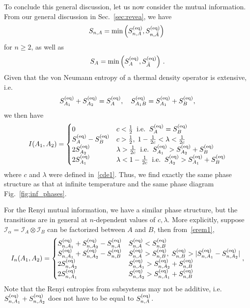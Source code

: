 \documentclass[a4paper,11pt]{article}
\newcommand\half{{\ensuremath{\frac{1}{2}}}}
\newcommand{\be}{\begin{equation}}
\newcommand{\ee}{\end{equation}}
\newcommand{\bca}{\begin{cases}}
\newcommand{\eca}{\end{cases}}
\newcommand\al{{\alpha}}
\newcommand\lam{\lambda}
\newcommand\ov{\over}
\newcommand\ha{{\half}}
\def\le{\left}
\def\ri{\right}
\newcommand\sE{{\ensuremath{{\mathcal E}}}}
\newcommand\sI{{\ensuremath{{\mathcal I}}}}
\begin{document}
To conclude this general discussion, let us now consider the mutual information. 
From our general discussion in Sec.~\ref{sec:revea}, we have 
\be \label{erem1}
S_{n, A}= {\rm min} \le(S_{n, A}^{({\rm eq})} , S_{n, \bar A}^{({\rm eq})}\ri) \ 
\ee
for $n \geq 2$, as well as 
\be 
S_{A}= {\rm min} \le(S_{A}^{({\rm eq})} , S_{\bar A}^{({\rm eq})}\ri) \, . 
\ee
Given that the von Neumann entropy of a thermal density operator is extensive, i.e.~
\be 
S_{A_1}^{( {\rm eq})} + S_{A_2}^{( {\rm eq})} = S_{A}^{({\rm eq})} , \quad
S_{A_1B}^{({\rm eq})} = S_{A_1}^{({\rm eq})} + S_{B}^{({\rm eq})} , 
\ee
we then have 
\be \label{nume}
I (A_1, A_2) = \bca 0 & c< \ha \; \; \text{i.e.} \; \; S_{A}^{( {\rm eq})} = S_B^{(\rm eq)} \cr
S_{A}^{({\rm eq})} - S_{B}^{( {\rm eq})} & c >\ha,\; 1-\frac{1}{2c}< \lambda< \frac{1}{2c} 
\cr
2 S_{A_2}^{({\rm eq})} & \lam > {1 \ov 2 c} \; \; \text{i.e.} \; \; S_{A_1}^{( {\rm eq})} > S_{A_2}^{( {\rm eq})} + S_B^{(\rm eq)} \cr
2 S_{A_1}^{({\rm eq})} & \lam < 1- {1 \ov 2 c} \; \; \text{i.e.} \; \; S_{A_2}^{( {\rm eq})} > S_{A_1}^{( {\rm eq})} + S_B^{(\rm eq)} 
\eca 
\ee
where $c$ and $\lam$ were defined in~\eqref{cde1}. Thus, we find exactly the same phase structure as that at infinite temperature and the same phase diagram Fig.~\ref{fig:inf_phases}. %

For the Renyi mutual information, we have a similar phase structure, but the transitions are in general at $n$-dependent values of $c, \lam$. More explicitly, suppose $\sI_\al = \sI_A \otimes \sI_B$ can be factorized between $A$ and $B$, then 
from~\eqref{erem1}, 
\be \label{nume1} 
I_n (A_1, A_2) = \bca S_{n, A_1}^{( {\rm eq})} + S_{n, A_2}^{( {\rm eq})} - S_{n, A}^{( {\rm eq})} & S^{\rm (eq)}_{n, A} < S^{\rm (eq)}_{n, B} \cr
S_{n, A_1}^{( {\rm eq})} + S_{n, A_2}^{( {\rm eq})} - S_{n, B}^{( {\rm eq})} & S^{\rm (eq)}_{n, A}>S^{\rm (eq)}_{n, B},\; S^{\rm (eq)}_{n, B} > | S^{\rm (eq)}_{n, A_1}- S^{\rm (eq)}_{n, A_2}| \cr
2 S_{n,A_2}^{({\rm eq})} & S^{\rm (eq)}_{n, A_1}> S^{\rm (eq)}_{n, A_2}+ S^{\rm (eq)}_{n, B} \cr
2 S_{n, A_1}^{({\rm eq})} & S^{\rm (eq)}_{n, A_2}> S^{\rm (eq)}_{n, A_1}+ S^{\rm (eq)}_{n, B}
\eca ,
\ee
Note that the Renyi entropies from subsystems may not be additive, i.e.~$S_{n, A_1}^{( {\rm eq})} + S_{n, A_2}^{( {\rm eq})} $
does not have to be equal to $S_{n, A}^{( {\rm eq})} $. 
\end{document}
